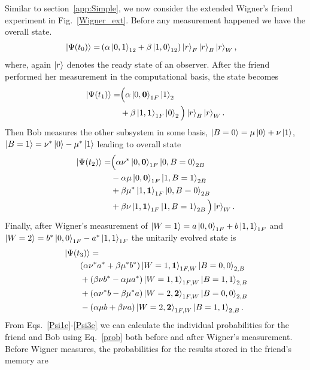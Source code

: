 \documentclass[a4paper,twocolumn,11pt,accepted=2017-05-09,dvipsnames]{quantumarticle}
\numberwithin{equation}{section}
\begin{document}
\begin{appendix}
Similar to section~\ref{app:Simple}, we now consider the extended Wigner's friend experiment in Fig.~\ref{Wigner_ext}. Before any measurement happened we have the overall state.
\begin{align}
\label{Psi0e}
\ket{\Psi(t_0)}= &\left( \alpha \ket{0,1}_{12} +\beta \ket{1,0}_{12}\right)\ket{r}_F\ket{r}_B\ket{r}_W,
\end{align}
where, again $\ket{r}$ denotes the ready state of an observer. After the friend performed her measurement in the computational basis, the state becomes
\begin{align}
\label{Psi1e}
\ket{\Psi(t_1)}=&\Big( \alpha \ket{0,\bm0}_{1F}\ket{1}_{2}  \\ \nonumber 
& +\beta \ket{1,\bm1}_{1F}\ket{0}_{2}\Big)\ket{r}_B\ket{r}_W.
\end{align}
Then Bob measures the other subsystem in some basis, $\ket{B=0}= \mu \ket{0}+\nu \ket{1}$, $\ket{B=1}= \nu^* \ket{0}- \mu^* \ket{1}$ leading to overall state
\begin{align}
\label{Psi2e}
\ket{\Psi(t_2)}=&\Big( \alpha \nu^* \ket{0,\bm0}_{1F}\ket{0, B=0}_{2B} \\ \nonumber
& -\alpha \mu \ket{0,\bm0}_{1F}\ket{1, B=1}_{2B} \\ \nonumber
& +\beta \mu^* \ket{1,\bm1}_{1F}\ket{0, B=0}_{2B}\\ \nonumber
&  +\beta \nu \ket{1,\bm1}_{1F}\ket{1, B=1}_{2B} \Big)\ket{r}_W.
\end{align}
Finally, after Wigner's measurement of $\ket{W=1}= a\ket{0,0}_{1F}+b\ket{1,1}_{1F}$ and $\ket{W=2}=b^*\ket{0,0}_{1F}-a^*\ket{1,1}_{1F}$ the unitarily evolved state is 
\begin{align}
\label{Psi3e}
&\ket{\Psi(t_3)}= \nonumber \\
&\qquad (\alpha \nu^* a^*+\beta\mu^* b^*)  \ket{W=1,\bm 1}_{1F,W}\ket{B=0,0}_{2,B} \nonumber \\
&\qquad +(\beta \nu b^*-\alpha\mu a^*) \ket{W=1,\bm1}_{1F,W}\ket{B=1,1}_{2,B}  \nonumber \\
&\qquad +(\alpha \nu^* b-\beta\mu^* a) \ket{W=2,\bm2}_{1F,W}\ket{B=0,0}_{2,B} \nonumber \\
&\qquad -(\alpha \mu b+\beta \nu a) \ket{W=2,\bm2}_{1F,W}\ket{B=1,1}_{2,B}.
\end{align}
From Eqs.~\eqref{Psi1e}-\eqref{Psi3e} we can calculate the individual probabilities for the friend and Bob using Eq.~\eqref{prob} both before and after Wigner's measurement. Before Wigner measures, the  probabilities for the results stored in the friend's memory are

\end{appendix}
\end{document}
